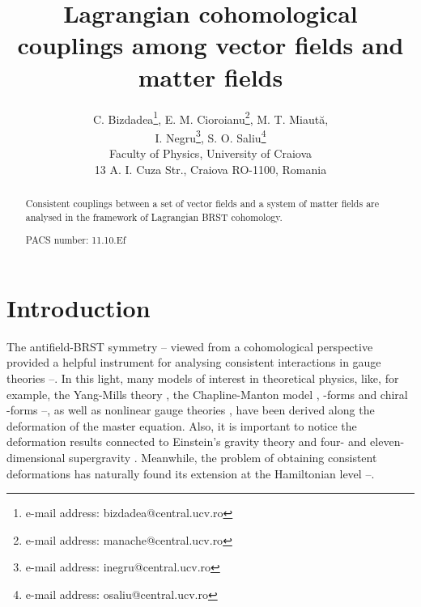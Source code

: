 \documentclass[a4paper,12pt]{article}
\begin{document}
\author{C. Bizdadea\thanks{%
e-mail address: bizdadea@central.ucv.ro},
E. M. Cioroianu\thanks{%
e-mail address: manache@central.ucv.ro},
M. T. Miaut\u {a}, \\
I. Negru\thanks{%
e-mail address: inegru@central.ucv.ro},
S. O. Saliu\thanks{%
e-mail address: osaliu@central.ucv.ro} \\
Faculty of Physics, University of Craiova\\
13 A. I. Cuza Str., Craiova RO-1100, Romania}
\title{Lagrangian cohomological couplings among
vector fields and matter fields}
\maketitle

\begin{abstract}
Consistent couplings between a set of vector
fields and a system of matter
fields are analysed in the framework of
Lagrangian BRST cohomology.

PACS number: 11.10.Ef
\end{abstract}

\section{Introduction}

The antifield-BRST symmetry \cite{1}--\cite{2}
viewed from a cohomological
perspective provided a helpful instrument
for analysing consistent
interactions in gauge theories \cite{3}--\cite{6}.
In this light, many
models of interest in theoretical physics, like,
for example, the Yang-Mills
theory \cite{7}, the Chapline-Manton model \cite{8},
\coordHE{}-forms and chiral \coordHE{}%
-forms \cite{9}--\cite{13}, as well as nonlinear
gauge theories \cite{13a},
have been derived along the deformation of the
master equation. Also, it is
important to notice the deformation results
connected to Einstein's gravity
theory \cite{14} and four- and eleven-dimensional
supergravity \cite{15}.
Meanwhile, the problem of obtaining consistent
deformations has naturally
found its extension at the Hamiltonian level
\cite{16}--\cite{19}.
\end{document}
